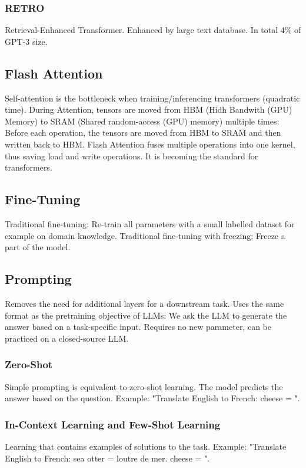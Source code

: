 \documentclass{scrartcl}
\begin{document}
\subsubsection*{RETRO}
Retrieval-Enhanced Transformer.
Enhanced by large text database.
In total 4\% of GPT-3 size.

\subsection*{Flash Attention}
Self-attention is the bottleneck when training/inferencing transformers (quadratic time).
During Attention, tensors are moved from HBM (Hidh Bandwith (GPU) Memory) to SRAM (Shared random-access (GPU) memory) multiple times: Before each operation, the tensors are moved from HBM to SRAM and then written back to HBM.
Flash Attention fuses multiple operations into one kernel, thus saving load and write operations. It is becoming the standard for transformers.

\subsection*{Fine-Tuning}
Traditional fine-tuning: Re-train all parameters with a small labelled dataset for example on domain knowledge.
Traditional fine-tuning with freezing: Freeze a part of the model.

\subsection*{Prompting}
Removes the need for additional layers for a downstream task. Uses the same format as the pretraining objective of LLMs: We ask the LLM to generate the answer based on a task-specific input.
Requires no new parameter, can be practiced on a closed-source LLM.

\subsubsection*{Zero-Shot}
Simple prompting is equivalent to zero-shot learning. The model predicts the answer based on the question.
Example: "Translate English to French: cheese = ".

\subsubsection*{In-Context Learning and Few-Shot Learning}
Learning that contains examples of solutions to the task.
Example: "Translate English to French: sea otter = loutre de mer. cheese = ".
\end{document}
